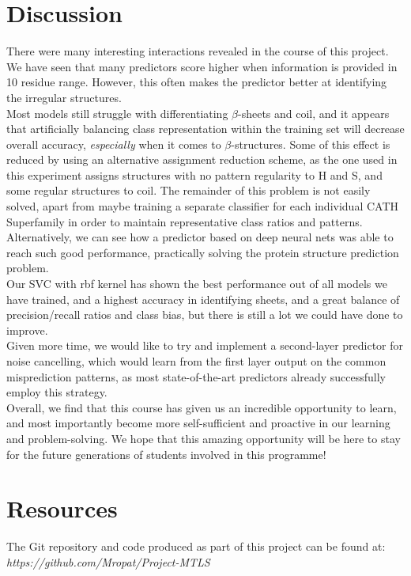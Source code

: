 \documentclass[12pt]{article}
\begin{document}
\section{Discussion}
There were many interesting interactions revealed in the course of this project. We have seen that many predictors score higher when information is provided in 10 residue range. However, this often makes the predictor better at identifying the irregular structures. \\
Most models still struggle with differentiating $\beta$-sheets and coil, and it appears that artificially balancing class representation within the training set will decrease overall accuracy, \textit{especially} when it comes to $\beta$-structures. Some of this effect is reduced by using an alternative assignment reduction scheme, as the one used in this experiment assigns structures with no pattern regularity to H and S, and some regular structures to coil. The remainder of this problem is not easily solved, apart from maybe training a separate classifier for each individual CATH Superfamily in order to maintain representative class ratios and patterns. Alternatively, we can see how a predictor based on deep neural nets was able to reach such good performance, practically solving the protein structure prediction problem. \\
Our SVC with rbf kernel has shown the best performance out of all models we have trained, and a highest accuracy in identifying sheets, and a great balance of precision/recall ratios and class bias, but there is still a lot we could have done to improve.\\
Given more time, we would like to try and implement a second-layer predictor for noise cancelling, which would learn from the first layer output on the common misprediction patterns, as most state-of-the-art predictors already successfully employ this strategy.\\
Overall, we find that this course has given us an incredible opportunity to learn, and most importantly become more self-sufficient and proactive in our learning and problem-solving. We hope that this amazing opportunity will be here to stay for the future generations of students involved in this programme!


\section{Resources}

\indent The Git repository and code produced as part of this project can be found at:\\
\emph{https://github.com/Mropat/Project-MTLS}
\end{document}
